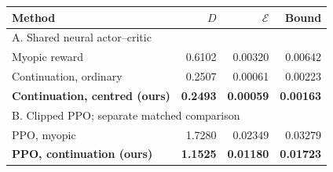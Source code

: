 \begin{tabular}{lrrr}
\toprule
Method & $D$ & $\mathcal E$ & Bound \\
\midrule
\multicolumn{4}{l}{A. Shared neural actor--critic} \\
Myopic reward & 0.6102 & 0.00320 & 0.00642 \\
Continuation, ordinary & 0.2507 & 0.00061 & 0.00223 \\
\textbf{Continuation, centred (ours)} & \textbf{0.2493} & \textbf{0.00059} & \textbf{0.00163} \\
\midrule
\multicolumn{4}{l}{B. Clipped PPO; separate matched comparison} \\
PPO, myopic & 1.7280 & 0.02349 & 0.03279 \\
\textbf{PPO, continuation (ours)} & \textbf{1.1525} & \textbf{0.01180} & \textbf{0.01723} \\
\bottomrule
\end{tabular}
